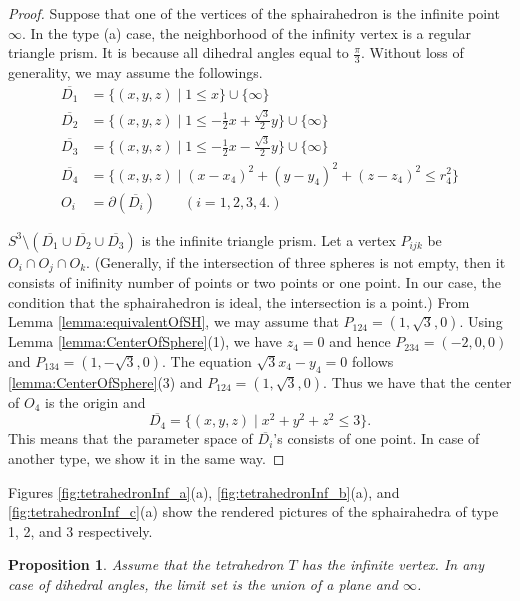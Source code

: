 \documentclass[suppldata, dvipdfmx]{interact}
\theoremstyle{plain}%
\newtheorem{proposition}[theorem]{Proposition}
\theoremstyle{definition}
\theoremstyle{remark}
\theoremstyle{problemstyle}
\begin{document}
\begin{proof}   Suppose that one of the vertices of the sphairahedron is the infinite point $\infty$.  In the type (a) case, the neighborhood of the infinity vertex is a regular triangle prism.  It is because all dihedral angles equal to $\frac{\pi}{3}$.  Without loss of generality, we may assume the followings.
\begin{align*}
\overline{D_1}&=\{(x,y,z) \mid 1 \le x \} \cup\{\infty\}\\
\overline{D_2}&=\{(x,y,z) \mid 1 \le -\frac{1}{2}x+\frac{\sqrt{3}}{2}y \} \cup\{\infty\}\\
\overline{D_3}&=\{(x,y,z) \mid 1 \le -\frac{1}{2}x-\frac{\sqrt{3}}{2}y \} \cup\{\infty\}\\
\overline{D_4}&=\{(x,y,z) \mid (x-x_4)^2+(y-y_4)^2+(z-z_4)^2 \le r_4^2\} \\
O_i & = \partial(\overline{D_i}) \qquad(i=1, 2, 3, 4.)
\end{align*}

$S^3\setminus(\overline{D_1} \cup \overline{D_2} \cup \overline{D_3})$ is the infinite triangle prism.  Let a vertex $P_{ijk}$ be $O_i \cap O_j \cap O_k$. (Generally, if the intersection of three spheres is not empty, then it consists of inifinity number of points or two points or one point.  In our case, the condition that the sphairahedron is ideal, the intersection is a point.) From Lemma \ref{lemma:equivalentOfSH}, we may assume that $P_{124}=(1,\sqrt{3}, 0)$.  Using Lemma \ref{lemma:CenterOfSphere}(1), we have $z_4=0$ and hence $P_{234}=(-2, 0, 0)$ and $P_{134}=(1, -\sqrt{3}, 0)$.  The equation $\sqrt{3}x_4 -y_4=0$ follows \ref{lemma:CenterOfSphere}(3) and $P_{124}=(1,\sqrt{3}, 0)$.  Thus we have that the center of $O_4$ is the origin and 
\[
\overline{D_4}=\{(x,y,z) \mid x^2+y^2+z^2 \le 3 \}.
\]   
This means that the parameter space of $\overline{D_i}$'s consists of one point.  In case of another type, we show it in the same way.
\end{proof}

Figures  \ref{fig:tetrahedronInf_a}(a), \ref{fig:tetrahedronInf_b}(a),
and \ref{fig:tetrahedronInf_c}(a) show the rendered pictures of the sphairahedra of type 1, 2, and 3 respectively.

\begin{proposition} \label{prop:tetrahedronLimitSet}
Assume that the tetrahedron $T$ has the infinite vertex.  In any case of dihedral angles, the limit set is the union of a plane and $\infty$.
\end{proposition}
\end{document}
